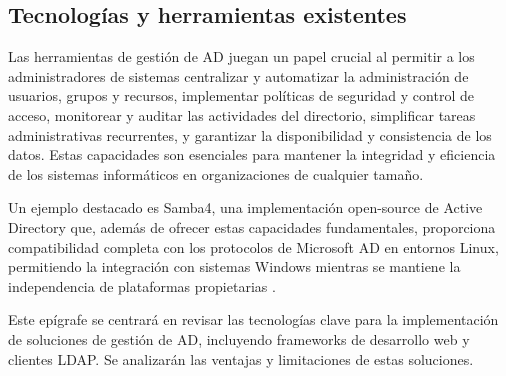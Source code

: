 \subsection{Tecnologías y herramientas existentes}

Las herramientas de gestión de AD juegan un papel crucial al permitir a los administradores de sistemas centralizar y automatizar la administración de usuarios, grupos y recursos, implementar políticas de seguridad y control de acceso, monitorear y auditar las actividades del directorio, simplificar tareas administrativas recurrentes, y garantizar la disponibilidad y consistencia de los datos. Estas capacidades son esenciales para mantener la integridad y eficiencia de los sistemas informáticos en organizaciones de cualquier tamaño.

Un ejemplo destacado es Samba4, una implementación open-source de Active Directory que, además de ofrecer estas capacidades fundamentales, proporciona compatibilidad completa con los protocolos de Microsoft AD en entornos Linux, permitiendo la integración con sistemas Windows mientras se mantiene la independencia de plataformas propietarias \autocite{imanudin_active_2019,carter_using_2007,samba_what_2019}.

Este epígrafe se centrará en revisar las tecnologías clave para la implementación de soluciones de gestión de AD, incluyendo frameworks de desarrollo web y clientes LDAP. Se analizarán las ventajas y limitaciones de estas soluciones.

% 


